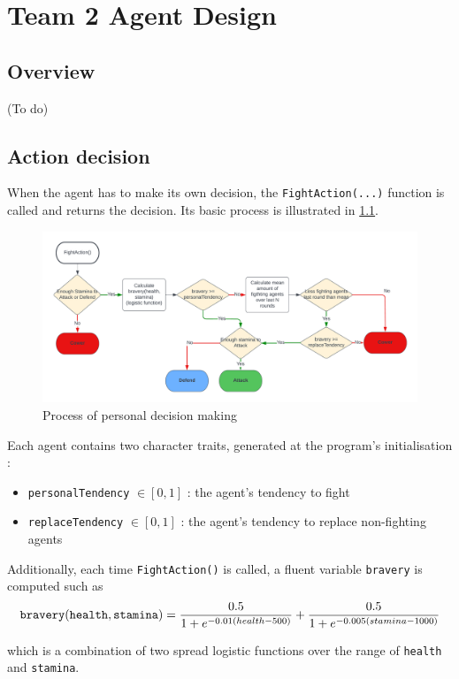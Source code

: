 \chapter{Team 2 Agent Design}\label{team_2_agent_design}

\section{Overview}
(To do)

\section{Action decision}
When the agent has to make its own decision, the \verb|FightAction(...)| function is called and returns the decision. Its basic process is illustrated in \ref{fig:fightaction}.

\begin{figure}[htb]
    \centering
    \includegraphics[width=\linewidth]{005_team_2_agent_design/fightaction.png}
    \caption{Process of personal decision making}
    \label{fig:fightaction}
\end{figure}

Each agent contains two character traits, generated at the program's initialisation : 

\begin{itemize}
    \item \verb|personalTendency| $\in[0,1]$ : the agent's tendency to fight
    \item \verb|replaceTendency| $\in[0,1]$ : the agent's tendency to replace non-fighting agents
\end{itemize}
Additionally, each time \verb|FightAction()| is called, a fluent variable \verb|bravery| is computed such as $$\verb|bravery|(\verb|health|, \verb|stamina|) = \frac{0.5}{1+e^{-0.01(health-500)}} + \frac{0.5}{1+e^{-0.005(stamina-1000)}}$$

which is a combination of two spread logistic functions over the range of \verb|health| and \verb|stamina|.

